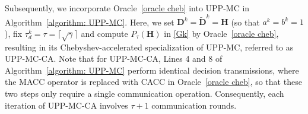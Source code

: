 \documentclass[12pt,draftcls,onecolumn]{IEEEtran}
\renewcommand{\Re}{{\mathbb{R}}}
\begin{document}
Subsequently, we incorporate Oracle~\ref{oracle cheb} into UPP-MC in Algorithm~\ref{algorithm: UPP-MC}. Here, we set $\mathbf{D}^k=\mathbf{\tilde{D}}^k=\mathbf{H}$ (so that $a^k=b^k=1$), fix $\tau_d^k=\tau=\lceil\sqrt{\gamma}\rceil$ and compute $P_{\tau}(\mathbf{H})$ in \eqref{Gk} by Oracle~\ref{oracle cheb}, resulting in its Chebyshev-accelerated specialization of UPP-MC, referred to as UPP-MC-CA. Note that for UPP-MC-CA, Lines 4 and 8 of Algorithm~\ref{algorithm: UPP-MC} perform identical decision transmissions, where the MACC operator is replaced with CACC in Oracle~\ref{oracle cheb}, so that these two steps only require a single communication operation. Consequently, each iteration of UPP-MC-CA involves $\tau+1$ communication rounds. 

\end{document}
